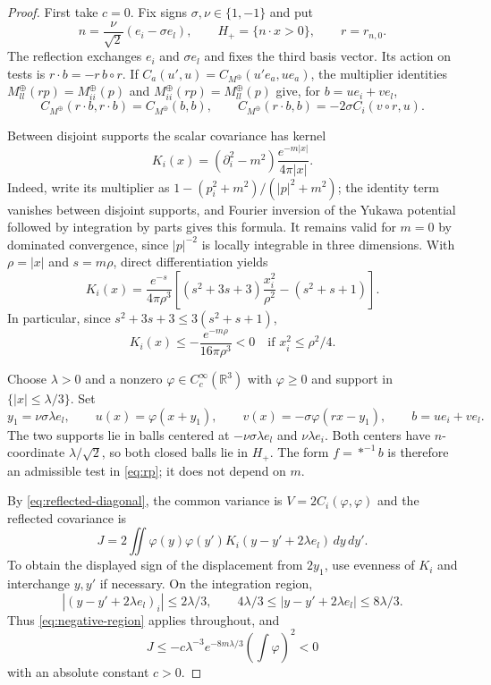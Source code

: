 \documentclass[11pt,letterpaper,reqno]{amsart}
\theoremstyle{definition}
\theoremstyle{remark}
\newcommand{\R}{\mathbb R}\newcommand{\C}{\mathbb C}
\begin{document}
\begin{proof}
First take $c=0$. Fix signs $\sigma,\nu\in\{1,-1\}$ and put
\[
 n=\frac{\nu}{\sqrt2}(e_i-\sigma e_l),\qquad
 H_+=\{n\cdot x>0\},\qquad r=r_{n,0}.
\]
The reflection exchanges $e_i$ and $\sigma e_l$ and fixes the third
basis vector. Its action on tests is $r\cdot b=-r\,b\circ r$.
If $C_a(u',u)=C_{M^\oplus}(u'e_a,ue_a)$, the multiplier identities
$M^\oplus_{ll}(rp)=M^\oplus_{ii}(p)$ and
$M^\oplus_{ii}(rp)=M^\oplus_{ll}(p)$ give, for $b=ue_i+ve_l$,
\begin{equation}\label{eq:reflected-diagonal}
 C_{M^\oplus}(r\cdot b,r\cdot b)=C_{M^\oplus}(b,b),\qquad
 C_{M^\oplus}(r\cdot b,b)=-2\sigma C_i(v\circ r,u).
\end{equation}

Between disjoint supports the scalar covariance has kernel
\[
 K_i(x)=(\partial_i^2-m^2)\frac{e^{-m|x|}}{4\pi|x|}.
\]
Indeed, write its multiplier as
$1-(p_i^2+m^2)/(|p|^2+m^2)$; the identity term vanishes between
disjoint supports, and Fourier inversion of the Yukawa potential
followed by integration by parts gives this formula. It remains
valid for $m=0$ by dominated convergence, since $|p|^{-2}$ is locally
integrable in three dimensions. With $\rho=|x|$ and $s=m\rho$,
direct differentiation yields
\begin{equation}\label{eq:negative-kernel}
 K_i(x)=\frac{e^{-s}}{4\pi\rho^3}
 \left[(s^2+3s+3)\frac{x_i^2}{\rho^2}-(s^2+s+1)\right].
\end{equation}
In particular, since $s^2+3s+3\le3(s^2+s+1)$,
\begin{equation}\label{eq:negative-region}
 K_i(x)\le-\frac{e^{-m\rho}}{16\pi\rho^3}<0
 \quad\text{if }x_i^2\le\rho^2/4.
\end{equation}

Choose $\lambda>0$ and a nonzero $\varphi\in C_c^\infty(\R^3)$
with $\varphi\ge0$ and support in $\{|x|\le\lambda/3\}$.
Set
\[
 y_1=\nu\sigma\lambda e_l,\qquad
 u(x)=\varphi(x+y_1),\qquad
 v(x)=-\sigma\varphi(rx-y_1),\qquad b=ue_i+ve_l.
\]
The two supports lie in balls centered at $-\nu\sigma\lambda e_l$
and $\nu\lambda e_i$. Both centers have $n$-coordinate
$\lambda/\sqrt2$, so both closed balls lie in $H_+$.
The form $f=*^{-1}b$ is therefore an admissible test in
\eqref{eq:rp}; it does not depend on $m$.

By \eqref{eq:reflected-diagonal}, the common variance is
$V=2C_i(\varphi,\varphi)$ and the reflected covariance is
\[
 J=2\iint\varphi(y)\varphi(y')
             K_i(y-y'+2\lambda e_l)\,dy\,dy'.
\]
To obtain the displayed sign of the displacement from $2y_1$, use
evenness of $K_i$ and interchange $y,y'$ if necessary.
On the integration region,
\[
 |(y-y'+2\lambda e_l)_i|\le2\lambda/3,
 \qquad4\lambda/3\le|y-y'+2\lambda e_l|\le8\lambda/3.
\]
Thus \eqref{eq:negative-region} applies throughout, and
\begin{equation}\label{eq:J-negative}
 J\le-c\lambda^{-3}e^{-8m\lambda/3}\left(\int\varphi\right)^2<0
\end{equation}
with an absolute constant $c>0$.


\end{proof}
\end{document}
